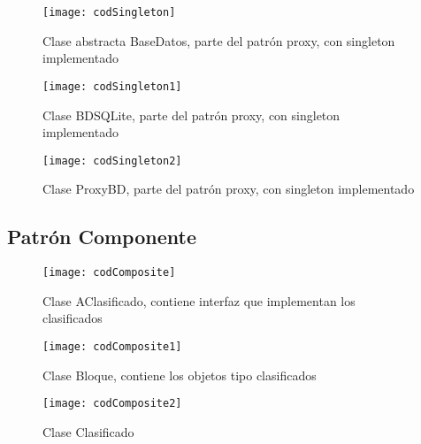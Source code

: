 \begin{figure}[H]
	\centering
	\texttt{[image: codSingleton]}
	\centering
	\caption{Clase abstracta BaseDatos, parte del patrón proxy, con singleton implementado}
	\label{fig:codSingleton}
\end{figure}
\begin{figure}[H]
	\centering
	\texttt{[image: codSingleton1]}
	\centering
	\caption{Clase BDSQLite, parte del patrón proxy, con singleton implementado}
	\label{fig:codSingleton1}
\end{figure}
\begin{figure}[H]
	\centering
	\texttt{[image: codSingleton2]}
	\centering
	\caption{Clase ProxyBD, parte del patrón proxy, con singleton implementado}
	\label{fig:codSingleton2}
\end{figure}

\subsection{Patrón Componente}
\begin{figure}[H]
	\centering
	\texttt{[image: codComposite]}
	\centering
	\caption{Clase AClasificado, contiene interfaz que implementan los clasificados}
	\label{fig:codSingleton2}
\end{figure}
\begin{figure}[H]
	\centering
	\texttt{[image: codComposite1]}
	\centering
	\caption{Clase Bloque, contiene los objetos tipo clasificados}
	\label{fig:codSingleton2}
\end{figure}
\begin{figure}[H]
	\centering
	\texttt{[image: codComposite2]}
	\centering
	\caption{Clase Clasificado}
	\label{fig:codSingleton2}
\end{figure}